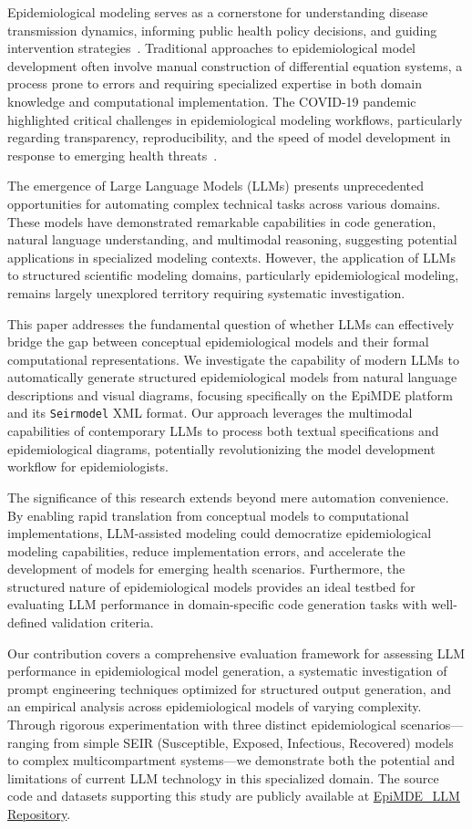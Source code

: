 \documentclass[conference]{IEEEtran}
\begin{document}
Epidemiological modeling serves as a cornerstone for understanding disease transmission dynamics, informing public health policy decisions, and guiding intervention strategies~\cite{b2}. Traditional approaches to epidemiological model development often involve manual construction of differential equation systems, a process prone to errors and requiring specialized expertise in both domain knowledge and computational implementation. The COVID-19 pandemic highlighted critical challenges in epidemiological modeling workflows, particularly regarding transparency, reproducibility, and the speed of model development in response to emerging health threats~\cite{b3}.

The emergence of Large Language Models (LLMs) presents unprecedented opportunities for automating complex technical tasks across various domains. These models have demonstrated remarkable capabilities in code generation, natural language understanding, and multimodal reasoning, suggesting potential applications in specialized modeling contexts. However, the application of LLMs to structured scientific modeling domains, particularly epidemiological modeling, remains largely unexplored territory requiring systematic investigation.

This paper addresses the fundamental question of whether LLMs can effectively bridge the gap between conceptual epidemiological models and their formal computational representations. We investigate the capability of modern LLMs to automatically generate structured epidemiological models from natural language descriptions and visual diagrams, focusing specifically on the EpiMDE platform~\cite{b1} and its \texttt{Seirmodel} XML format. Our approach leverages the multimodal capabilities of contemporary LLMs to process both textual specifications and epidemiological diagrams, potentially revolutionizing the model development workflow for epidemiologists.

The significance of this research extends beyond mere automation convenience. By enabling rapid translation from conceptual models to computational implementations, LLM-assisted modeling could democratize epidemiological modeling capabilities, reduce implementation errors, and accelerate the development of models for emerging health scenarios. Furthermore, the structured nature of epidemiological models provides an ideal testbed for evaluating LLM performance in domain-specific code generation tasks with well-defined validation criteria.

Our contribution covers a comprehensive evaluation framework for assessing LLM performance in epidemiological model generation, a systematic investigation of prompt engineering techniques optimized for structured output generation, and an empirical analysis across epidemiological models of varying complexity. Through rigorous experimentation with three distinct epidemiological scenarios---ranging from simple SEIR (Susceptible, Exposed, Infectious, Recovered) models to complex multicompartment systems---we demonstrate both the potential and limitations of current LLM technology in this specialized domain. The source code and datasets supporting this study are publicly available at \href{https://github.com/aad1tyak/EpiMDE_LLM}{EpiMDE\_LLM Repository}.
\end{document}

